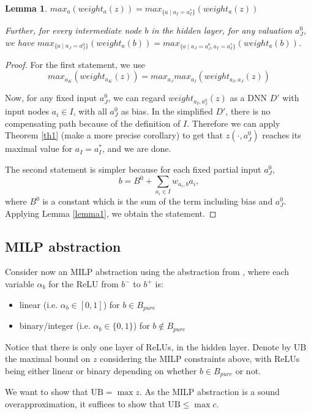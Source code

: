 \documentclass[]{article}
\newtheorem{lemma}{Lemma}
\theoremstyle{definition}
\begin{document}
\begin{lemma} \label{lem:reach_max}
	$max_a (weight_{a}(z)) = max_{\{a \mid a_I=a^*_I\}} (weight_{a}(z))$
	
	Further, for every intermediate node $b$ in the hidden layer, for any valuation $a^0_J$, 
	we have $max_{\{a \mid a_J=a^0_J\}} (weight_{a}(b)) = max_{\{a \mid a_J=a^0_J,a_I=a_I^*\}} (weight_{a}(b))$.	
\end{lemma}

\begin{proof}
	For the first statement, we use 
	$$max_{a_K} (weight_{a_K}(z)) = max_{a_J} max_{a_I} (weight_{a_I,a_J}(z))$$
	
	Now, for any fixed input $a^0_J$, we can regard $weight_{a_I,a^0_J}(z)$ as a DNN $D'$ with input nodes $a_i\in I$, with all $a^0_J$ %
	as bias. In the simplified $D'$, there is no compensating path because of the definition of $I$. Therefore we can apply Theorem \ref{th1} (make a more precise corollary) to get that $z(\cdot,a^0_J)$ reaches its maximal value for $a_I=a_I^*$, and we are done.
	
	The second statement is simpler because for each fixed partial input $a^0_J$, 
	$$b= B^0 +\sum_{a_i\in I} w_{a_i, b} a_i,$$ where $B^0$ is a constant which is the sum of the term including bias and $a^0_J$. Applying Lemma \ref{lemma1}, we obtain the statement.
\end{proof}

\subsection{MILP abstraction}

Consider now an MILP abstraction using the abstraction from \cite{MILP}, 
where each variable $\alpha_b$ for the ReLU from $b^-$ to $b^+$ is:
\begin{itemize}
	\item linear  (i.e. $\alpha_b \in [0,1]$) for $b \in B_{pure}$
	\item binary/integer (i.e. $\alpha_b \in \{0,1\}$) for $b \notin B_{pure}$
\end{itemize}

Notice that there is only one layer of ReLUs, in the hidden layer.
Denote by $\mathrm{UB}$ the maximal bound on $z$ considering the MILP constraints above, with ReLUs being either linear or binary depending on whether $b \in B_{pure}$ or not.

We want to show that $\mathrm{UB} = \max z$. As the MILP abstraction is a sound overapproximation, 
it suffices to show that $\mathrm{UB}\leq \max c$.
\end{document}
